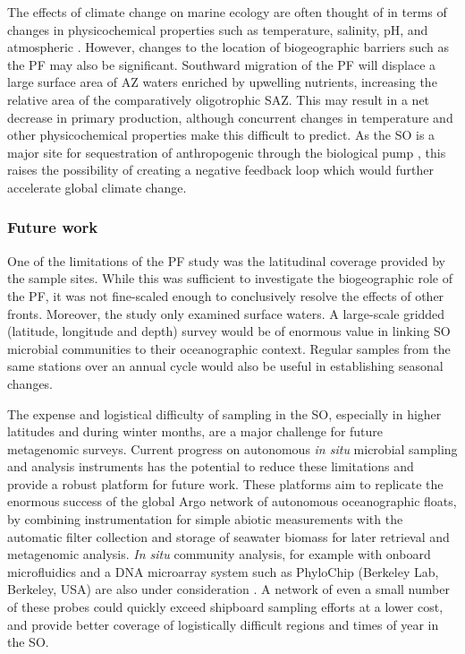 The effects of climate change on marine ecology are often thought of in terms of changes in physicochemical properties such as temperature, salinity, pH, and atmospheric .
However, changes to the location of biogeographic barriers such as the \ac{PF} may also be significant.
Southward migration of the \ac{PF} will displace a large surface area of \ac{AZ} waters enriched by upwelling nutrients, increasing the relative area of the comparatively oligotrophic \ac{SAZ}.
This may result in a net decrease in primary production, although concurrent changes in temperature and other physicochemical properties make this difficult to predict.
As the \ac{SO} is a major site for sequestration of anthropogenic  through the biological pump \cite{Thomalla:2011hi}, this raises the possibility of creating a negative feedback loop \cite{Cox:2000ko} which would further accelerate global climate change.

\subsubsection{Future work}

One of the limitations of the \ac{PF} study was the latitudinal coverage provided by the sample sites.
While this was sufficient to investigate the biogeographic role of the \ac{PF}, it was not fine-scaled enough to conclusively resolve the effects of other fronts.
Moreover, the study only examined surface waters.
A large-scale gridded (latitude, longitude and depth) survey would be of enormous value in linking \ac{SO} microbial communities to their oceanographic context.
Regular samples from the same stations over an annual cycle would also be useful in establishing seasonal changes.

The expense and logistical difficulty of sampling in the \ac{SO}, especially in higher latitudes and during winter months, are a major challenge for future metagenomic surveys.
Current progress on autonomous \textit{in situ} microbial sampling and analysis instruments \cite{CSIRO:2012uw} has the potential to reduce these limitations and provide a robust platform for future work.
These platforms aim to replicate the enormous success of the global Argo network of autonomous oceanographic floats, by combining instrumentation for simple abiotic measurements with the automatic filter collection and storage of seawater biomass for later retrieval and metagenomic analysis.
\textit{In situ} community analysis, for example with onboard microfluidics and a DNA microarray system such as PhyloChip (Berkeley Lab, Berkeley, USA) are also under consideration \cite{CSIRO:2012uw}.
A network of even a small number of these probes could quickly exceed shipboard sampling efforts at a lower cost, and provide better coverage of logistically difficult regions and times of year in the \ac{SO}.

